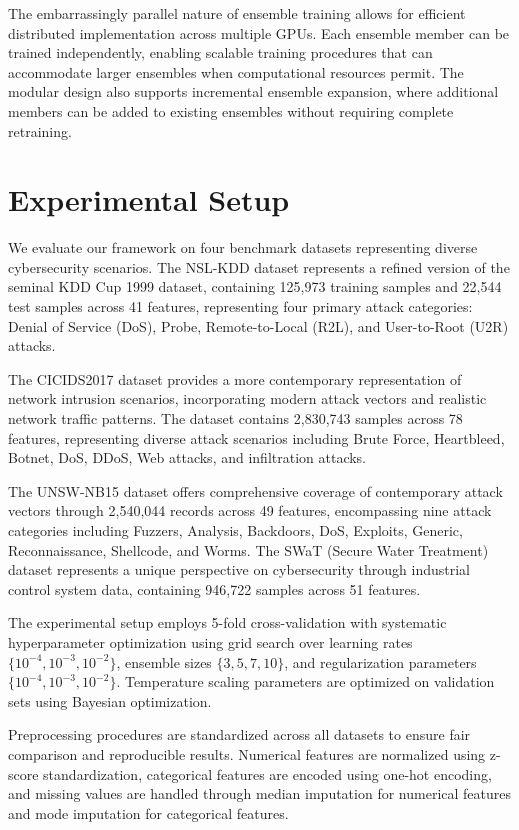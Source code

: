 \documentclass[journal]{IEEEtran}
\begin{document}
The embarrassingly parallel nature of ensemble training allows for efficient distributed implementation across multiple GPUs. Each ensemble member can be trained independently, enabling scalable training procedures that can accommodate larger ensembles when computational resources permit. The modular design also supports incremental ensemble expansion, where additional members can be added to existing ensembles without requiring complete retraining.

\section{Experimental Setup}

We evaluate our framework on four benchmark datasets representing diverse cybersecurity scenarios. The NSL-KDD dataset represents a refined version of the seminal KDD Cup 1999 dataset, containing 125,973 training samples and 22,544 test samples across 41 features, representing four primary attack categories: Denial of Service (DoS), Probe, Remote-to-Local (R2L), and User-to-Root (U2R) attacks.

The CICIDS2017 dataset provides a more contemporary representation of network intrusion scenarios, incorporating modern attack vectors and realistic network traffic patterns. The dataset contains 2,830,743 samples across 78 features, representing diverse attack scenarios including Brute Force, Heartbleed, Botnet, DoS, DDoS, Web attacks, and infiltration attacks.

The UNSW-NB15 dataset offers comprehensive coverage of contemporary attack vectors through 2,540,044 records across 49 features, encompassing nine attack categories including Fuzzers, Analysis, Backdoors, DoS, Exploits, Generic, Reconnaissance, Shellcode, and Worms. The SWaT (Secure Water Treatment) dataset represents a unique perspective on cybersecurity through industrial control system data, containing 946,722 samples across 51 features.

The experimental setup employs 5-fold cross-validation with systematic hyperparameter optimization using grid search over learning rates $\{10^{-4}, 10^{-3}, 10^{-2}\}$, ensemble sizes $\{3, 5, 7, 10\}$, and regularization parameters $\{10^{-4}, 10^{-3}, 10^{-2}\}$. Temperature scaling parameters are optimized on validation sets using Bayesian optimization.

Preprocessing procedures are standardized across all datasets to ensure fair comparison and reproducible results. Numerical features are normalized using z-score standardization, categorical features are encoded using one-hot encoding, and missing values are handled through median imputation for numerical features and mode imputation for categorical features.
\end{document}

